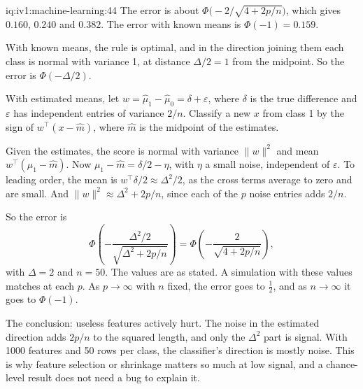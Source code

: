 \begin{solution}{iq:iv1:machine-learning:44}
The error is about $\Phi\bigl(-2/\sqrt{4 + 2p/n}\bigr)$, which gives $0.160$, $0.240$ and $0.382$. The error with known means is $\Phi(-1) = 0.159$.

With known means, the rule is optimal, and in the direction joining them each class is normal with variance 1, at distance $\Delta/2 = 1$ from the midpoint. So the error is $\Phi(-\Delta/2)$.

With estimated means, let $w = \hat{\mu}_1 - \hat{\mu}_0 = \delta + \varepsilon$, where $\delta$ is the true difference and $\varepsilon$ has independent entries of variance $2/n$. Classify a new $x$ from class 1 by the sign of $w^\top(x - \hat{m})$, where $\hat{m}$ is the midpoint of the estimates.

Given the estimates, the score is normal with variance $\|w\|^2$ and mean $w^\top(\mu_1 - \hat{m})$. Now $\mu_1 - \hat{m} = \delta/2 - \eta$, with $\eta$ a small noise, independent of $\varepsilon$. To leading order, the mean is $w^\top\delta/2 \approx \Delta^2/2$, as the cross terms average to zero and are small. And $\|w\|^2 \approx \Delta^2 + 2p/n$, since each of the $p$ noise entries adds $2/n$.

So the error is
\[
\Phi\left(-\frac{\Delta^2/2}{\sqrt{\Delta^2 + 2p/n}}\right) = \Phi\left(-\frac{2}{\sqrt{4 + 2p/n}}\right),
\]
with $\Delta = 2$ and $n = 50$. The values are as stated. A simulation with these values matches at each $p$. As $p \to \infty$ with $n$ fixed, the error goes to $\frac12$, and as $n \to \infty$ it goes to $\Phi(-1)$.

The conclusion: useless features actively hurt. The noise in the estimated direction adds $2p/n$ to the squared length, and only the $\Delta^2$ part is signal. With 1000 features and 50 rows per class, the classifier's direction is mostly noise. This is why feature selection or shrinkage matters so much at low signal, and a chance-level result does not need a bug to explain it.



\end{solution}

